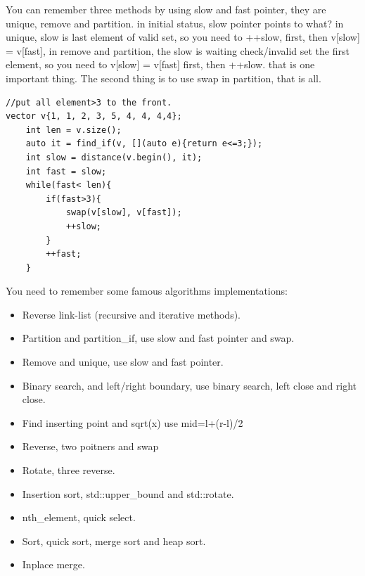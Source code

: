 \documentclass[a4paper,11pt,twoside]{book}
\begin{document}
\par You can remember three methods by using slow and fast pointer, 
they are unique, remove and partition. in initial status, slow pointer points to what?  in unique, slow is last element of valid set, so you need to ++slow, first, then v[slow] = v[fast], in remove and partition, the slow is waiting check/invalid set the first element, so you need to v[slow] = v[fast] first, then ++slow. that is one important thing. The second thing is to use swap in partition, that is all. 

\begin{lstlisting}
//put all element>3 to the front. 
vector v{1, 1, 2, 3, 5, 4, 4, 4,4}; 
    int len = v.size();
    auto it = find_if(v, [](auto e){return e<=3;});
    int slow = distance(v.begin(), it);
    int fast = slow;
    while(fast< len){
        if(fast>3){
            swap(v[slow], v[fast]);
            ++slow;
        }
        ++fast;
    }
\end{lstlisting}

\par You need to remember some famous algorithms implementations:
\begin{itemize}
	\item Reverse link-list (recursive and iterative methods).
	
	\item Partition and partition\_if, use slow and fast pointer and swap.
	
	\item Remove and unique, use slow and fast pointer.
	
	\item Binary search, and left/right boundary, use binary search, left close and right close.
	
	\item Find inserting point and sqrt(x) use mid=l+(r-l)/2
	
	\item Reverse, two poitners and swap
	
	\item Rotate, three reverse. 
	
	\item Insertion sort, std::upper\_bound and std::rotate.
	
	\item nth\_element, quick select.
	
	\item Sort, quick sort, merge sort and heap sort.
	
	\item Inplace merge.
\end{itemize}
\end{document}
